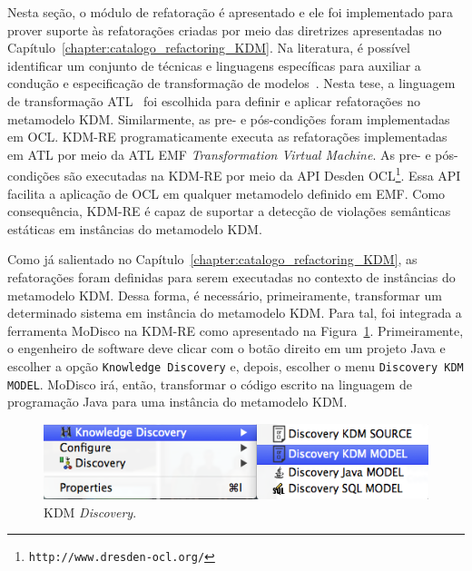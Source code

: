 Nesta seção, o módulo de refatoração é apresentado e ele foi implementado para prover suporte às refatorações criadas por meio das diretrizes apresentadas no Capítulo~\ref{chapter:catalogo_refactoring_KDM}. Na literatura, é possível identificar um conjunto de técnicas e linguagens específicas para auxiliar a condução e especificação de transformação de modelos~\cite{Biehl_2010, Mens_2006, Allilaire_06}. Nesta tese, a linguagem de transformação ATL~\cite{ATL_eclipse,Jouault_2008} foi escolhida para definir e aplicar refatorações no metamodelo KDM. Similarmente, as pre- e pós-condições foram implementadas em OCL. KDM-RE programaticamente executa as refatorações implementadas em ATL por meio da ATL EMF \textit{Transformation Virtual Machine}. As pre- e pós-condições são executadas na KDM-RE por meio da API Desden OCL\footnote{\texttt{http://www.dresden-ocl.org/}}. Essa API facilita a aplicação de OCL em qualquer metamodelo definido em EMF. Como consequência, KDM-RE é capaz de suportar a detecção de violações semânticas estáticas em instâncias do metamodelo KDM.


Como já salientado no Capítulo~\ref{chapter:catalogo_refactoring_KDM}, as refatorações foram definidas para serem executadas no contexto de instâncias do metamodelo KDM. Dessa forma, é necessário, primeiramente, transformar um determinado sistema em instância do metamodelo KDM. Para tal, foi integrada a ferramenta MoDisco na KDM-RE como apresentado na Figura~\ref{fig:kdm_modisco_discovery}. Primeiramente, o engenheiro de software deve clicar com o botão direito em um projeto Java e escolher a opção \texttt{Knowledge Discovery} e, depois, escolher o menu \texttt{Discovery KDM MODEL}. MoDisco irá, então, transformar o código escrito na linguagem de programação Java para uma instância do metamodelo KDM. 

\begin{figure}[h]
	\centering
	\caption{KDM \textit{Discovery}.}
	\label{fig:kdm_modisco_discovery}
	\includegraphics[scale=0.65]{images/kdm_discovery_kdm_re}
	\fautor
\end{figure}

